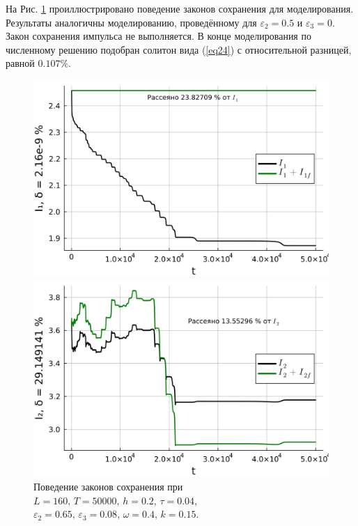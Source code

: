 \documentclass[14pt,a4paper]{extreport}
\begin{document}
			На Рис. \ref{fig340-7} проиллюстрировано поведение законов сохранения для моделирования. Результаты аналогичны моделированию, проведённому для \(\varepsilon_{2}=0.5\) и \(\varepsilon_{3}=0\). Закон сохранения импульса не выполняется. В конце моделирования по численному решению подобран солитон вида (\ref{eq24}) с относительной разницей, равной \(0.107\%\).
			\begin{figure}[H] %
				\begin{center}
					\begin{minipage}[h]{0.48\linewidth}
						\includegraphics[width=1\linewidth]{fig69.png}
					\end{minipage}
					\hfill
					\begin{minipage}[h]{0.48\linewidth}
						\includegraphics[width=1\linewidth]{fig70.png}
					\end{minipage}
				\end{center}
				\caption{Поведение законов сохранения при
				\(L=160,\, T=50000,\, h=0.2,\, \tau=0.04,\)
				\(\varepsilon_{2}=0.65,\,\varepsilon_{3}=0.08,\, \omega=0.4,\, k=0.15\).}
				\label{fig340-7}
			\end{figure}
\end{document}
